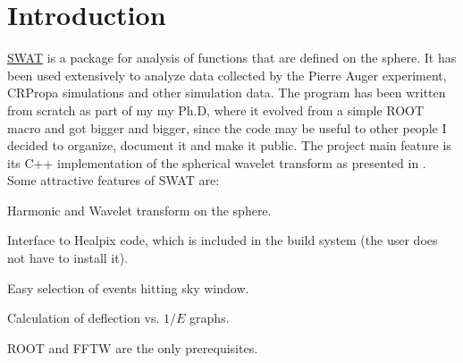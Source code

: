 \documentclass[12pt]{article}
\begin{document}
  \vfill


\newpage
\tableofcontents

\newpage
\section{Introduction} \label{ch::Introduction}

\href{http://www.ifi.unicamp.br/~mzimbres}{SWAT} is a package for analysis of
functions that are defined on the sphere. It has been used extensively to
analyze data collected by the Pierre Auger experiment, CRPropa simulations and
other simulation data. The program has been written from scratch as part of my
my Ph.D, where it evolved from a simple ROOT macro and got bigger and bigger,
since the code may be useful to other people I decided to organize, document it
and make it public. The project main feature is its C++ implementation of the
spherical wavelet transform as presented in \cite{wiaux}.  Some attractive
features of SWAT are:

\begin{list}{}{}
\item Harmonic and Wavelet transform on the sphere.
\item Interface to Healpix code, which is included in the build system (the user
does not have to install it).
\item Easy selection of events hitting sky window. 
\item Calculation of deflection vs. $1/E$ graphs.
\item ROOT and FFTW are the only prerequisites.
\end{list}
\end{document}
